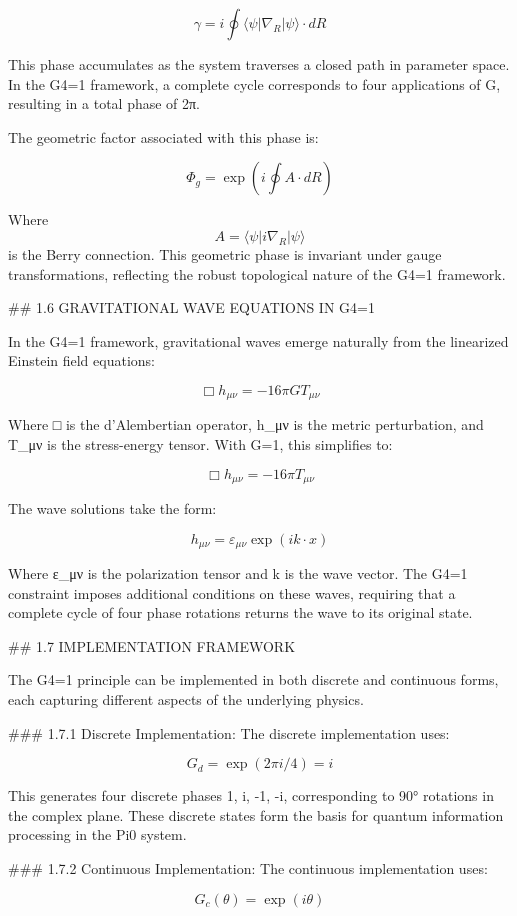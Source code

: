 $$\gamma = i\oint\langle\psi|\nabla_R|\psi\rangle \cdot dR$$

This phase accumulates as the system traverses a closed path in parameter space. In the G4=1 framework, a complete cycle corresponds to four applications of G, resulting in a total phase of 2π.

The geometric factor associated with this phase is:

$$\Phi_g = \exp(i\oint A \cdot dR)$$

Where $$A = \langle\psi|i\nabla_R|\psi\rangle$$ is the Berry connection. This geometric phase is invariant under gauge transformations, reflecting the robust topological nature of the G4=1 framework.

## 1.6 GRAVITATIONAL WAVE EQUATIONS IN G4=1

In the G4=1 framework, gravitational waves emerge naturally from the linearized Einstein field equations:

$$\Box h_{\mu\nu} = -16\pi G T_{\mu\nu}$$

Where □ is the d'Alembertian operator, h_μν is the metric perturbation, and T_μν is the stress-energy tensor. With G=1, this simplifies to:

$$\Box h_{\mu\nu} = -16\pi T_{\mu\nu}$$

The wave solutions take the form:

$$h_{\mu\nu} = \varepsilon_{\mu\nu}\exp(ik \cdot x)$$

Where ε_μν is the polarization tensor and k is the wave vector. The G4=1 constraint imposes additional conditions on these waves, requiring that a complete cycle of four phase rotations returns the wave to its original state.

## 1.7 IMPLEMENTATION FRAMEWORK

The G4=1 principle can be implemented in both discrete and continuous forms, each capturing different aspects of the underlying physics.

### 1.7.1 Discrete Implementation:
The discrete implementation uses:

$$G_d = \exp(2\pi i/4) = i$$

This generates four discrete phases {1, i, -1, -i}, corresponding to 90° rotations in the complex plane. These discrete states form the basis for quantum information processing in the Pi0 system.

### 1.7.2 Continuous Implementation:
The continuous implementation uses:

$$G_c(\theta) = \exp(i\theta)$$

